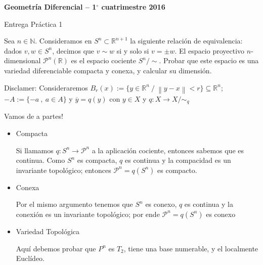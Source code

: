 \documentclass[11pt]{article}
\renewcommand{\P}{\mathcal{P}}
\newcommand{\R}{{\mathbb{R}}}
\newcommand{\N}{{\mathbb{N}}}
\newcommand\norm[1]{\left\lVert#1\right\rVert}
\newcommand{\sett}[1]{\{#1\}}
\newenvironment{proof}[1][Demostraci\'on]{\begin{trivlist}
\item[\hskip \labelsep {\bfseries #1}]}{\end{trivlist}}
\begin{document}
\pagestyle{empty}
\pagestyle{fancy}
\fancyfoot[CO]{\slshape \thepage}
\renewcommand{\headrulewidth}{0pt}



\centerline{\bf Geometr\'ia Diferencial -- 1$^\circ$
cuatrimestre 2016}
\centerline{\sc Entrega Pr\'actica 1}

\bigskip

Sea $n \in \N$. Consideramos en $S^n \subset \R^{n+1}$ la siguiente relaci\'on de 
equivalencia: dados $v, w \in S^n$, decimos que $v \sim w$ si y solo si $v = \pm w$. 
El espacio proyectivo $n$-dimensional $\P^n(\R)$ es el espacio cociente $S^n/\sim$.
Probar que este espacio es una variedad diferenciable compacta y conexa, y calcular su 
dimensi\'on.

\begin{proof}

Disclamer: Consideraremos $B_r(x) := \sett{y \in \R^n \ / \ \norm{y-x} < r} \subseteq \R^n$;  $-A := \sett{-a \ , \ a \in A}$ y $\overline{y}= q(y)$ con $y \in X$ y $q:X \rightarrow X/ \sim_q$

Vamos de a partes!

\begin{itemize}

\item Compacta

Si llamamos $q:S^n \rightarrow \P^n$ a la aplicaci\'on cociente, entonces sabemos que es continua. Como $S^n$ es compacta, $q$ es continua y la compacidad es un invariante topol\'ogico; entonces $\P^n = q(S^n)$ es compacto.

\item Conexa

Por el mismo argumento tenemos que $S^n$ es conexo, $q$ es continua y la conexi\'on es un invariante topol\'ogico; por ende $\P^n = q(S^n)$ es conexo

\item Variedad Topol\'ogica

Aqu\'i debemos probar que $P^n$ es $T_2$, tiene una base numerable, y el localmente Eucl\'ideo.

\begin{enumerate}


\end{enumerate}
\end{itemize}
\end{proof}
\end{document}
